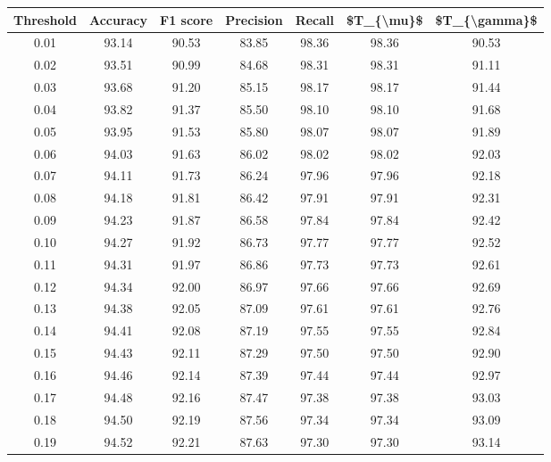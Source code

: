 \begin{tabular}{|c|c|c|c|c|c|c|}
\hline
 Threshold &  Accuracy &  F1 score &  Precision &  Recall &  \$T\_\{\textbackslash mu\}\$ &  \$T\_\{\textbackslash gamma\}\$ \\
\hline
      0.01 &     93.14 &     90.53 &      83.85 &   98.36 &      98.36 &         90.53 \\
      0.02 &     93.51 &     90.99 &      84.68 &   98.31 &      98.31 &         91.11 \\
      0.03 &     93.68 &     91.20 &      85.15 &   98.17 &      98.17 &         91.44 \\
      0.04 &     93.82 &     91.37 &      85.50 &   98.10 &      98.10 &         91.68 \\
      0.05 &     93.95 &     91.53 &      85.80 &   98.07 &      98.07 &         91.89 \\
      0.06 &     94.03 &     91.63 &      86.02 &   98.02 &      98.02 &         92.03 \\
      0.07 &     94.11 &     91.73 &      86.24 &   97.96 &      97.96 &         92.18 \\
      0.08 &     94.18 &     91.81 &      86.42 &   97.91 &      97.91 &         92.31 \\
      0.09 &     94.23 &     91.87 &      86.58 &   97.84 &      97.84 &         92.42 \\
      0.10 &     94.27 &     91.92 &      86.73 &   97.77 &      97.77 &         92.52 \\
      0.11 &     94.31 &     91.97 &      86.86 &   97.73 &      97.73 &         92.61 \\
      0.12 &     94.34 &     92.00 &      86.97 &   97.66 &      97.66 &         92.69 \\
      0.13 &     94.38 &     92.05 &      87.09 &   97.61 &      97.61 &         92.76 \\
      0.14 &     94.41 &     92.08 &      87.19 &   97.55 &      97.55 &         92.84 \\
      0.15 &     94.43 &     92.11 &      87.29 &   97.50 &      97.50 &         92.90 \\
      0.16 &     94.46 &     92.14 &      87.39 &   97.44 &      97.44 &         92.97 \\
      0.17 &     94.48 &     92.16 &      87.47 &   97.38 &      97.38 &         93.03 \\
      0.18 &     94.50 &     92.19 &      87.56 &   97.34 &      97.34 &         93.09 \\
      0.19 &     94.52 &     92.21 &      87.63 &   97.30 &      97.30 &         93.14 \\

\end{tabular}

